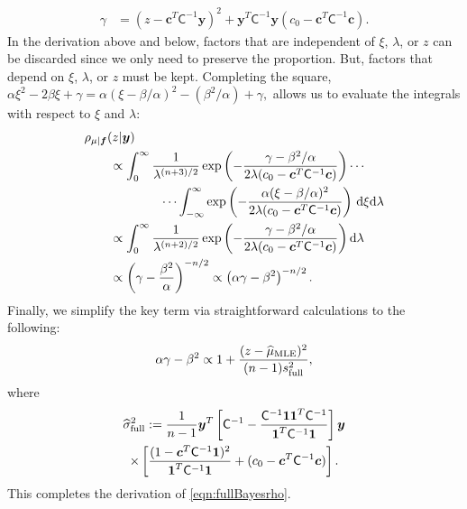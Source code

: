 \documentclass[twocolumn]{svjour3}          %
\newcommand{\bm}[1]{\boldsymbol{#1}}
\newcommand{\D}[1]{\text{d}{#1}}
\newcommand{\vc}{\bm{c}}
\newcommand{\vf}{\bm{f}}
\newcommand{\vy}{\bm{y}}
\newcommand{\vone}{\bm{1}}
\newcommand{\mC}{\mathsf{C}}
\newcommand{\hmu}{\widehat{\mu}}
\newcommand{\hsigma}{\widehat{\sigma}}
\begin{document}
\begin{appendices}
\begin{align*}
\gamma &  = (z - \vc^T \mC^{-1} \vy )^2  + \vy^T \mC^{-1} \vy (c_0  -\vc ^T \mC^{-1} \vc).
\end{align*}
In the derivation above and below, factors that are independent of $\xi$, $\lambda$, or $z$ can be discarded since we only need to preserve the proportion.  But, factors that depend on $\xi$, $\lambda$, or $z$ must be kept.  
Completing the square, $
\alpha \xi^2 -2 \beta \xi + \gamma 
= \alpha (\xi -\beta/\alpha)^2  - (\beta^2/\alpha) + \gamma,
$
allows us to evaluate the integrals with respect to $\xi$ and $\lambda$:
\begin{align*}
\MoveEqLeft{\rho_{\mu|\vf}(z | \vy)} \\
& \propto \displaystyle \int_{0}^\infty  \frac{1}{\lambda^{(n+3)/2}}  \exp\left( -\frac{  \gamma - \beta^2/\alpha}{2\lambda(c_0  -\vc ^T \mC^{-1} \vc)} \right)  \cdots \\
& \qquad \qquad \cdots \int_{-\infty}^\infty  \exp\left( -\frac{\alpha (\xi -\beta/\alpha)^2}{2\lambda(c_0  -\vc ^T \mC^{-1} \vc)} \right) \, \D \xi \D \lambda \\
& \propto \displaystyle \int_{0}^\infty  \frac{1}{\lambda^{(n+2)/2}}  \exp\left( -\frac{  \gamma - \beta^2/\alpha}{2\lambda(c_0  -\vc ^T \mC^{-1} \vc)} \right) \D \lambda \\
& \propto \left(\gamma - \frac{\beta^2}{\alpha}\right)^{-n/2} \propto \left(\alpha \gamma - \beta^2\right)^{-n/2}.
\end{align*}
Finally, we simplify the key term via straightforward calculations to the following:
\begin{align*}
\alpha \gamma - \beta^2 \propto 1 +  \frac{(z - \hmu_{\textup{MLE}})^2}{(n-1)s_{\textup{full}}^2},
\end{align*}
where 
\begin{multline*}
\hsigma_{\textup{full}}^2
:= \frac{1}{n-1}
\vy^T\left[ \mC^{-1} 
- \frac{ \mC^{-1} \vone\vone^T \mC^{-1}}{\vone^T \mC^{-1} \vone}  \right]\vy
\\ 
\times  \left[\frac{(1 - \vc^T \mC^{-1} \vone)^2}{\vone^T \mC^{-1} \vone} + (c_0  -\vc ^T \mC^{-1} \vc) \right].
\end{multline*}
This completes the derivation of \eqref{eqn:fullBayesrho}.
\end{appendices}

\end{document}
